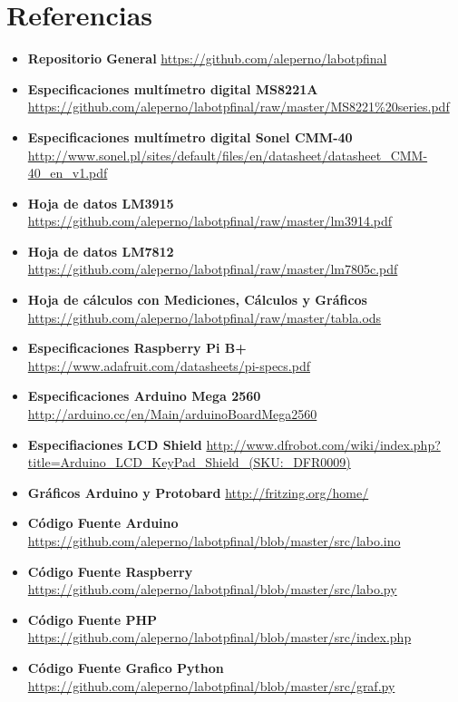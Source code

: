 \documentclass[12pt,a4paper]{article}
\begin{document}
	\section{Referencias}
		\label{sec:referencias}
		\begin{itemize}
		\item \textbf{Repositorio General} \url{https://github.com/aleperno/labotpfinal}
		\item \textbf{Especificaciones multímetro digital MS8221A} \url{https://github.com/aleperno/labotpfinal/raw/master/MS8221%20series.pdf}
		\item \textbf{Especificaciones multímetro digital Sonel CMM-40} \url{http://www.sonel.pl/sites/default/files/en/datasheet/datasheet_CMM-40_en_v1.pdf}
		\item \textbf{Hoja de datos LM3915} \url{https://github.com/aleperno/labotpfinal/raw/master/lm3914.pdf}
		\item \textbf{Hoja de datos LM7812} \url{https://github.com/aleperno/labotpfinal/raw/master/lm7805c.pdf}
		\item \textbf{Hoja de cálculos con Mediciones, Cálculos y Gráficos} \url{https://github.com/aleperno/labotpfinal/raw/master/tabla.ods}
		\item \textbf{Especificaciones Raspberry Pi B+} \url{https://www.adafruit.com/datasheets/pi-specs.pdf}
		\item \textbf{Especificaciones Arduino Mega 2560} \url{http://arduino.cc/en/Main/arduinoBoardMega2560}
		\item \textbf{Especifiaciones LCD Shield} \url{http://www.dfrobot.com/wiki/index.php?title=Arduino_LCD_KeyPad_Shield_(SKU:_DFR0009)}
		\item \textbf{Gráficos Arduino y Protobard} \url{http://fritzing.org/home/}
		\item \textbf{Código Fuente Arduino} \url{https://github.com/aleperno/labotpfinal/blob/master/src/labo.ino}
		\item \textbf{Código Fuente Raspberry} \url{https://github.com/aleperno/labotpfinal/blob/master/src/labo.py}
		\item \textbf{Código Fuente PHP} \url{https://github.com/aleperno/labotpfinal/blob/master/src/index.php}
		\item \textbf{Código Fuente Grafico Python} \url{https://github.com/aleperno/labotpfinal/blob/master/src/graf.py}
		\end{itemize}
\end{document}
